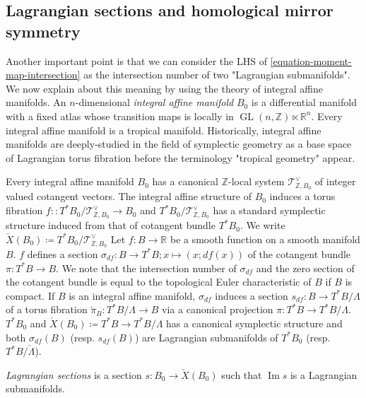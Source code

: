 \documentclass[a4paper,dvipdfmx,reqno,12pt]{amsart}
\theoremstyle{definition}
\newcommand{\deq}{\coloneqq}
\newcommand{\opn}[1]{\operatorname{#1}}
\numberwithin{equation}{section}
\begin{document}

\subsection{Lagrangian sections and 
homological mirror symmetry}

Another important point is that 
we can consider the LHS of 
\cref{equation-moment-map-intersection}
as the intersection number 
of two "Lagrangian submanifolds".
We now explain about this meaning by
using the theory of integral affine manifolds.
An $n$-dimensional 
\emph{integral affine manifold} $B_0$ 
is a differential manifold 
with a fixed atlas whose transition maps is locally in 
$\opn{GL}(n,\mathbb{Z})\ltimes \mathbb{R}^{n}$.
Every integral affine manifold is a tropical manifold.
Historically, integral affine manifolds are 
deeply-studied in the field of symplectic geometry 
as a base space of Lagrangian torus fibration before
the terminology "tropical geometry" appear.

Every integral affine manifold $B_0$ has 
a canonical $\mathbb{Z}$-local system 
$\mathcal{T}^{\vee}_{\mathbb{Z},B_0}$ of integer
valued cotangent vectors. 
The integral affine structure of $B_0$ induces a
torus fibration 
$f\colon \colon T^{*}B_0/\mathcal{T}^{\vee}_{\mathbb{Z},B_0}
\to B_0$ and 
$T^{*}B_0/\mathcal{T}^{\vee}_{\mathbb{Z},B_0}$ has 
a standard symplectic structure induced from that of 
cotangent bundle $T^{*}B_0$.
We write $\check{X}(B_0)\deq 
T^{*}B_0/\mathcal{T}^{\vee}_{\mathbb{Z},B_0}$
Let $f\colon B\to \mathbb{R}$ be a 
smooth function on a smooth manifold $B$.
$f$ defines a section 
$\sigma_{df}\colon B\to T^{*}B; x\mapsto (x;df(x))$ of 
the cotangent bundle $\pi\colon T^{*}B\to B$.
We note that the intersection number of 
$\sigma_{df}$ and the zero section of the cotangent
bundle is equal to the topological Euler characteristic
of $B$ if $B$ is compact.
If $B$ is an integral affine manifold,
$\sigma_{df}$ induces a section 
$s_{df}\colon B\to T^*B/\Lambda$ of a torus fibration
$\check{\pi}_B\colon T^*B/\Lambda \to B$ via a canonical 
projection $\pi \colon T^*B\to T^*B/\Lambda$.
$T^{*}B_0$ and $\check{X}(B_0)\deq T^*B\to T^*B/\Lambda$
has a canonical symplectic structure and
both $\sigma_{df}(B)$ (resp. $s_{df}(B)$) are Lagrangian 
submanifolds of $T^{*}B_0$ 
(resp. $T^*B/\check{\Lambda}$).

\emph{Lagrangian sections} is a section 
$s\colon B_0\to \check{X}(B_0)$ such that 
$\opn{Im} s$ is a Lagrangian submanifolds.
\end{document}
